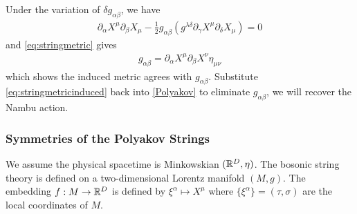 \documentclass[10pt]{article}
\begin{document}
Under the variation of $\delta g_{\alpha\beta}$, we have 
\begin{align}
    \partial_\alpha X^\mu \partial_\beta X_\mu-\frac{1}{2}g_{\alpha\beta}\left(g^{\lambda\delta}\partial_\gamma X^\mu\partial_\delta X_\mu\right)=0\label{eq:stringmetric}
\end{align}
and \eqref{eq:stringmetric} gives 
\begin{align}
    g_{\alpha\beta}=\partial_\alpha X^\mu \partial_\beta X^\nu \eta_{\mu\nu}\label{eq:stringmetricinduced}
\end{align}
which shows the induced metric agrees with $g_{\alpha\beta}$.
Substitute \eqref{eq:stringmetricinduced} back into \eqref{Polyakov} to eliminate $g_{\alpha\beta}$, we will recover the Nambu action.

\subsubsection{Symmetries of the Polyakov Strings}
We assume the physical spacetime is Minkowskian $(\mathbb{R}^D,\eta)$.
The bosonic string theory is defined on a two-dimensional Lorentz manifold $(M,g)$.
The embedding $f:M\to\mathbb{R}^D$ is defined by $\xi^\alpha\mapsto X^\mu$ where $\{\xi^\alpha\}=(\tau,\sigma)$ are the local coordinates of $M$.
\end{document}
